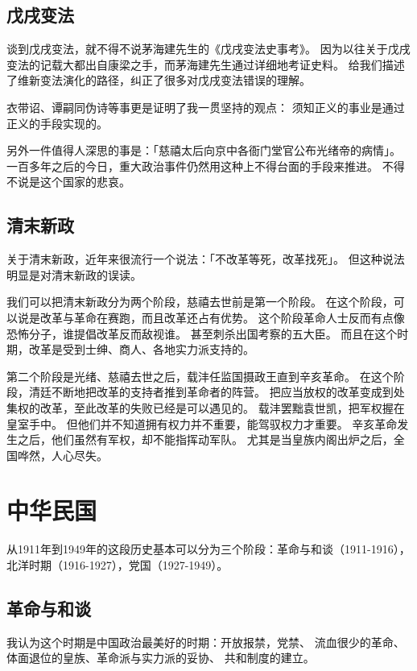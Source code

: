 \documentclass[12pt]{article}
\begin{document}
\subsection{戊戌变法}
谈到戊戌变法，就不得不说茅海建先生的《戊戌变法史事考》。
因为以往关于戊戌变法的记载大都出自康梁之手，而茅海建先生通过详细地考证史料。
给我们描述了维新变法演化的路径，纠正了很多对戊戌变法错误的理解。

衣带诏、谭嗣同伪诗等事更是证明了我一贯坚持的观点：
须知正义的事业是通过正义的手段实现的。

另外一件值得人深思的事是：「慈禧太后向京中各衙门堂官公布光绪帝的病情」。
一百多年之后的今日，重大政治事件仍然用这种上不得台面的手段来推进。
不得不说是这个国家的悲哀。

\subsection{清末新政}
关于清末新政，近年来很流行一个说法：「不改革等死，改革找死」。
但这种说法明显是对清末新政的误读。

我们可以把清末新政分为两个阶段，慈禧去世前是第一个阶段。
在这个阶段，可以说是改革与革命在赛跑，而且改革还占有优势。
这个阶段革命人士反而有点像恐怖分子，谁提倡改革反而敌视谁。
甚至刺杀出国考察的五大臣。
而且在这个时期，改革是受到士绅、商人、各地实力派支持的。

第二个阶段是光绪、慈禧去世之后，载沣任监国摄政王直到辛亥革命。
在这个阶段，清廷不断地把改革的支持者推到革命者的阵营。
把应当放权的改革变成到处集权的改革，至此改革的失败已经是可以遇见的。
载沣罢黜袁世凯，把军权握在皇室手中。
但他们并不知道拥有权力并不重要，能驾驭权力才重要。
辛亥革命发生之后，他们虽然有军权，却不能指挥动军队。
尤其是当皇族内阁出炉之后，全国哗然，人心尽失。
\section{中华民国}
从1911年到1949年的这段历史基本可以分为三个阶段：革命与和谈（1911-1916），北洋时期（1916-1927），党国（1927-1949）。
\subsection{革命与和谈}
我认为这个时期是中国政治最美好的时期：开放报禁，党禁、
流血很少的革命、体面退位的皇族、革命派与实力派的妥协、
共和制度的建立。
\end{document}
